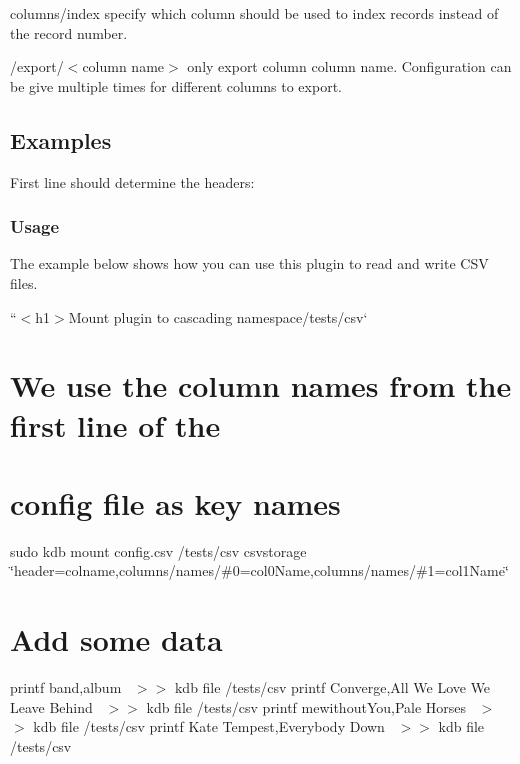 {\ttfamily columns/index} specify which column should be used to index records instead of the record number.

{\ttfamily /export/$<$column name$>$} only export column {\ttfamily column name}. Configuration can be give multiple times for different columns to export.

\subsection*{Examples}

First line should determine the headers\+: 


\subsubsection*{Usage}

The example below shows how you can use this plugin to read and write C\+SV files.

``{\ttfamily  $<$h1$>$Mount plugin to cascading namespace}/tests/csv` \section*{We use the column names from the first line of the}

\section*{config file as key names}

sudo kdb mount config.\+csv /tests/csv csvstorage \char`\"{}header=colname,columns/names/\#0=col0\+Name,columns/names/\#1=col1\+Name\char`\"{}

\section*{Add some data}

printf \textquotesingle{}band,album~\newline
\textquotesingle{} $>$$>$ {\ttfamily kdb file /tests/csv} printf \textquotesingle{}Converge,All We Love We Leave Behind~\newline
\textquotesingle{} $>$$>$ {\ttfamily kdb file /tests/csv} printf \textquotesingle{}mewithout\+You,Pale Horses~\newline
\textquotesingle{} $>$$>$ {\ttfamily kdb file /tests/csv} printf \textquotesingle{}Kate Tempest,Everybody Down~\newline
\textquotesingle{} $>$$>$ {\ttfamily kdb file /tests/csv}

